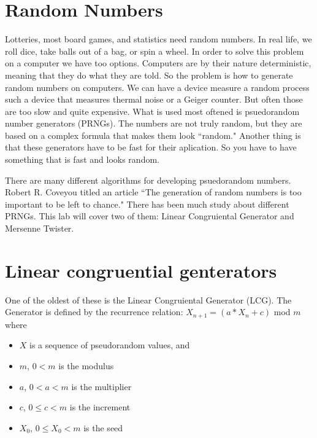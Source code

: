 \label{Ch:PRNG}


\section*{Random Numbers}


Lotteries, most board games, and statistics need random numbers. In real life, we roll dice, take balls out of a bag, or spin a wheel. In order to solve this problem on a computer we have too options. Computers are by their nature deterministic, meaning that they do what they are told. So the problem is how to generate random numbers on computers. We can have a device measure a random process such a device that measures thermal noise or a Geiger counter. But often those are too slow and quite expensive. What is used most oftened is psuedorandom number generators (PRNGs). The numbers are not truly random, but they are based on a complex formula that makes them look ``random." Another thing is that these generators have to be fast for their aplication. So you have to have something that is fast and looks random.

There are many different algorithms for developing psuedorandom numbers. Robert R. Coveyou titled an article ``The generation of random numbers is too important to be left to chance." There has been much study about different PRNGs. This lab will cover two of them: Linear Congruiental Generator and Mersenne Twister.

\section*{Linear congruential genterators}

One of the oldest of these is the Linear Congruiental Generator (LCG). The Generator is defined by the recurrence relation:
$X_{n+1}=(a*X_n + c)$ mod $m$ where

\begin{itemize}
\item[] $X$ is a sequence of pseudorandom values, and
\item[] $m$, $0<m$ is the modulus
\item[] $a$, $0<a<m$ is the multiplier
\item[] $c$, $0\leq c<m$ is the increment
\item[] $X_0$, $0\leq X_0 <m$ is the seed
\end{itemize}


